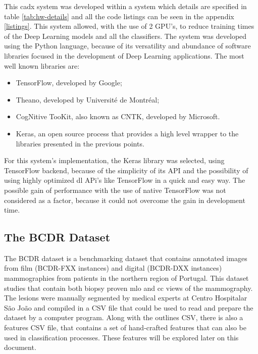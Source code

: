 \documentclass[
  twoside,
  11pt, a4paper,
  footinclude=true,
  headinclude=true,
  cleardoublepage=empty
]{scrbook}
\begin{document}
      This \gls{cadx} system was developed within a system which details are specified in table \ref{tab:hw-details} and all the code listings can be seen in the appendix \ref{listings}. This system allowed, with the use of 2 GPU's, to reduce training times of the Deep Learning models and all the classifiers. The system was developed using the Python language, because of its versatility and abundance of software libraries focused in the development of Deep Learning applications. The most well known libraries are:

      \begin{itemize}
          \item TensorFlow, developed by Google;
          \item Theano, developed by Université de Montréal;
          \item CogNitive TooKit, also known as CNTK, developed by Microsoft.
          \item Keras, an open source process that provides a high level wrapper to the libraries presented in the previous points.
      \end{itemize}

      For this system's implementation, the Keras library was selected, using TensorFlow backend, because of the simplicity of its API and the possibility of using highly optimized \gls{dl} APi's like TensorFlow in a quick and easy way. The possible gain of performance with the use of native TensorFlow was not considered as a factor, because it could not overcome the gain in development time.

      \subsection{The BCDR Dataset} \label{development:bcdr}


        The BCDR dataset \cite{lopez2012bcdr} is a benchmarking dataset that contains annotated images from film (BCDR-FXX instances) and digital (BCDR-DXX instances) mammographies from patients in the northern region of Portugal. This dataset studies that contain both biopsy proven \gls{mlo} and \gls{cc} views of the mammography. The lesions were manually segmented by medical experts at Centro Hospitalar São João and compiled in a CSV file that could be used to read and prepare the dataset by a computer program. Along with the outlines CSV, there is also a features CSV file, that contains a set of hand-crafted features that can also be used in classification processes. These features will be explored later on this document.
\end{document}
